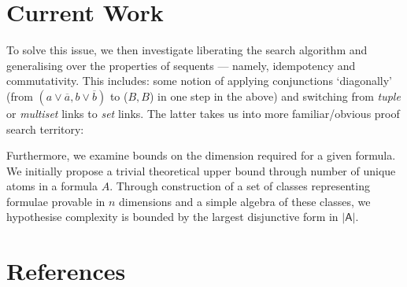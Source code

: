 \documentclass{article}
\newcommand\0{0}
\newcommand\1{1}
\newcommand\+{+}
\renewcommand\*{\times}
\newcommand\subs[1]{\mathsf{|#1|}}
\newcommand\dual{\overline}
\begin{document}
    \section*{Current Work}
        To solve this issue, we then investigate liberating the search algorithm and generalising over the properties of sequents --- namely, idempotency and commutativity.
        This includes: some notion of applying conjunctions `diagonally' (from $(a \vee \dual a, b \vee \dual b)$ to ($B, B$) in one step in the above) and switching from \emph{tuple} or \emph{multiset} links to \emph{set} links.
        The latter takes us into more familiar/obvious proof search territory:
        \begin{figure}[H]
            \def\x{1cm}
            \def\y{1cm}
            \centering
        \end{figure}

        Furthermore, we examine bounds on the dimension required for a given formula.
        We initially propose a trivial theoretical upper bound through number of unique atoms in a formula $A$.
        Through construction of a set of classes representing formulae provable in $n$ dimensions and a simple algebra of these classes, we hypothesise complexity is bounded by the largest disjunctive form in $\subs A$.



    \section*{References}
        
\end{document}
